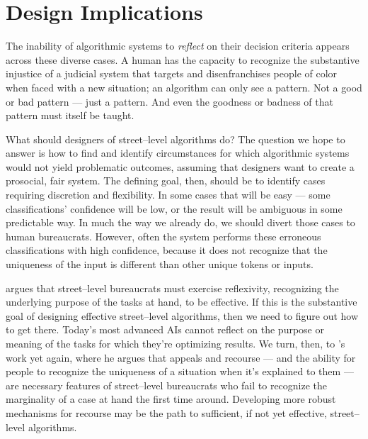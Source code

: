 \documentclass[main]{subfiles}
\begin{document}
\section{Design Implications}

The inability of algorithmic systems to
\textit{reflect} on their decision criteria
appears across these diverse cases.
A human has the capacity to recognize
the substantive injustice of
a judicial system that targets and disenfranchises people of color when faced with a new situation;
an algorithm can only see a pattern.
Not a good or bad pattern --- just a pattern.
And even the goodness or badness of that pattern must itself be taught.


What should designers of street--level algorithms do?
The question we hope to answer is how to find and identify circumstances
for which algorithmic systems would not yield problematic outcomes,
assuming that designers want to create a prosocial, fair system.
The defining goal, then, should be to identify cases requiring discretion and flexibility.
In some cases that will be easy
--- some classifications' confidence will be low, or
the result will be ambiguous in some predictable way.
In much the way we already do, we should divert those cases to human bureaucrats.
However, often the system performs these erroneous classifications with high confidence, because
it does not recognize that the uniqueness of the input is different than other unique tokens or inputs.

\citeauthor{lipsky1983street} argues that street--level bureaucrats must exercise reflexivity,
recognizing the underlying purpose of the tasks at hand, to be effective.
If this is the substantive goal of designing effective street--level algorithms, then we need to figure out how to get there.
Today's most advanced AIs cannot reflect on the purpose or meaning of the tasks for which they're optimizing results.
We turn, then, to \citeauthor{lipsky1983street}'s work yet again, where
he argues that appeals and recourse
--- and the ability for people to recognize the uniqueness of a situation when it's explained to them ---
are necessary features of street--level bureaucrats who fail to recognize the marginality of a case at hand the first time around.
Developing more robust mechanisms for recourse may be the path to sufficient, if not yet effective, street--level algorithms.
\end{document}

